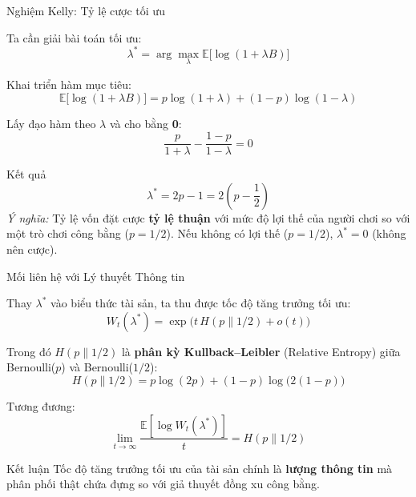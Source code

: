 \begin{frame}{Nghiệm Kelly: Tỷ lệ cược tối ưu}

Ta cần giải bài toán tối ưu:
\[
\lambda^* = \arg\max_{\lambda} \mathbb{E} \big[ \log(1+\lambda B) \big]
\]

Khai triển hàm mục tiêu:
\[
\mathbb{E} \big[ \log(1+\lambda B) \big] = p\log(1+\lambda) + (1-p)\log(1-\lambda)
\]

Lấy đạo hàm theo $\lambda$ và cho bằng \textbf{0}:
\[
\frac{p}{1+\lambda} - \frac{1-p}{1-\lambda} = 0
\]

\begin{block}{Kết quả}
\[ \lambda^* = 2p - 1 = 2\left(p - \frac{1}{2}\right) \]
\textit{Ý nghĩa:} Tỷ lệ vốn đặt cược \textbf{tỷ lệ thuận} với mức độ lợi thế của người chơi so với một trò chơi công bằng ($p=1/2$). Nếu không có lợi thế ($p=1/2$), $\lambda^* = 0$ (không nên cược).
\end{block}

\end{frame}

\begin{frame}{Mối liên hệ với Lý thuyết Thông tin}

Thay $\lambda^*$ vào biểu thức tài sản, ta thu được tốc độ tăng trưởng tối ưu:
\[
W_t(\lambda^*) = \exp \Big( t\,H(p\|1/2) + o(t) \Big)
\]

Trong đó $H(p\|1/2)$ là \textbf{phân kỳ Kullback--Leibler} (Relative Entropy) giữa Bernoulli($p$) và Bernoulli($1/2$):
\[
H(p\|1/2) = p\log(2p) + (1-p)\log\big(2(1-p)\big)
\]

Tương đương:
\[
\lim_{t\to\infty} \frac{\mathbb{E}[\log W_t(\lambda^*)]}{t} = H(p\|1/2)
\]

\begin{alertblock}{Kết luận}
Tốc độ tăng trưởng tối ưu của tài sản chính là \textbf{lượng thông tin} mà phân phối thật chứa đựng so với giả thuyết đồng xu công bằng.
\end{alertblock}

\end{frame}

